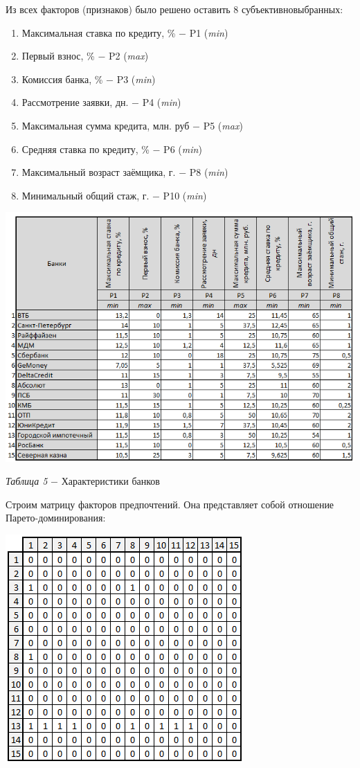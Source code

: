 \documentclass[14pt,fleqn]{extarticle}
\begin{document}
	Из всех факторов (признаков) было решено оставить 8 субъективновыбранных:
	\begin{enumerate}[nolistsep]
		\item Максимальная ставка по кредиту, \% $-$ P1 (\textit{min})
		\item Первый взнос, \% $-$ P2 (\textit{max})
		\item Комиссия банка, \% $-$ P3 (\textit{min})
		\item Рассмотрение заявки, дн. $-$ P4 (\textit{min})
		\item Максимальная сумма кредита, млн. руб $-$ P5 (\textit{max})
		\item Средняя ставка по кредиту, \% $-$ P6 (\textit{min})
		\item Максимальный возраст заёмщика, г. $-$ P8 (\textit{min})
		\item Минимальный общий стаж, г. $-$ P10 (\textit{min})
	\end{enumerate}
	\begin{center}
		\includegraphics[scale=0.9]{7}
	\end{center}
	\begin{center}
		\textit{Таблица 5} $-$ Характеристики банков
	\end{center}
	\newpage
	Строим матрицу факторов предпочтений. Она представляет собой отношение Парето-доминирования:
	\begin{center}
		\includegraphics[scale=0.9]{8}
	\end{center}
\end{document}
